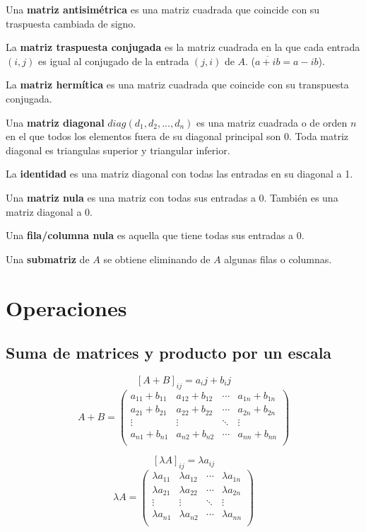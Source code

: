 Una \textbf{matriz antisimétrica} es una matriz cuadrada que coincide con su traspuesta cambiada de signo.

La \textbf{matriz traspuesta conjugada} es la matriz cuadrada en la que cada entrada $(i,j)$ es igual al conjugado de la entrada $(j,i)$ de $A$. ($\overline{a+ib}=a-ib$).

La \textbf{matriz hermítica} es una matriz cuadrada que coincide con su transpuesta conjugada.

Una \textbf{matriz diagonal} $diag(d_{1},d_{2},...,d_{n})$ es una matriz cuadrada o de orden $n$ en el que todos los elementos fuera de su diagonal principal son 0. Toda matriz diagonal es triangulas superior y triangular inferior.

La \textbf{identidad} es una matriz diagonal con todas las entradas en su diagonal a 1.

Una \textbf{matriz nula} es una matriz con todas sus entradas a 0. También es una matriz diagonal a 0.

Una \textbf{fila/columna nula} es aquella que tiene todas sus entradas a 0.

Una \textbf{submatriz} de $A$ se obtiene eliminando de $A$ algunas filas o columnas.

\section{Operaciones}

\subsection{Suma de matrices y producto por un escala}
\[
[A+B]_{ij} = a_ij + b_ij
\]
\[
A+B=\begin{pmatrix}
a_{11} + b_{11} & a_{12} + b_{12} & \cdots & a_{1n} + b_{1n} \\
a_{21} + b_{21} & a_{22} + b_{22} & \cdots & a_{2n} + b_{2n} \\
\vdots & \vdots & \ddots & \vdots  \\
a_{n1} + b_{n1} & a_{n2} + b_{n2} & \cdots & a_{nn} + b_{nn} \\
\end{pmatrix}
\]

\[
[\lambda A]_{ij}=\lambda a_{ij}
\]
\[
\lambda A = \begin{pmatrix}
\lambda a_{11} & \lambda a_{12} & \cdots & \lambda a_{1n}  \\
\lambda a_{21} & \lambda a_{22} & \cdots & \lambda a_{2n}  \\
\vdots & \vdots & \ddots & \vdots  \\
\lambda a_{n1} & \lambda a_{n2} & \cdots & \lambda a_{nn}  \\
\end{pmatrix}
\]

